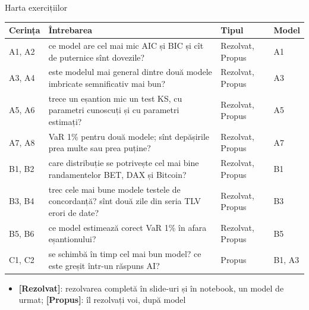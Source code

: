 \begin{frame}{Harta exercițiilor}
\itemsize{\small}
\begin{center}
\footnotesize
\begin{tabular}{>{\raggedright\arraybackslash}p{1.1cm}>{\raggedright\arraybackslash}p{7.5cm}>{\raggedright\arraybackslash}p{1.9cm}>{\raggedright\arraybackslash}p{1.4cm}}
\toprule
\textbf{Cerința} & \textbf{Întrebarea} & \textbf{Tipul} & \textbf{Model} \\
\midrule
A1, A2 & ce model are cel mai mic AIC și BIC și cît de puternice sînt dovezile? & Rezolvat, Propus & A1 \\
A3, A4 & este modelul mai general dintre două modele imbricate semnificativ mai bun? & Rezolvat, Propus & A3 \\
A5, A6 & trece un eșantion mic un test KS, cu parametri cunoscuți și cu parametri estimați? & Rezolvat, Propus & A5 \\
A7, A8 & VaR 1\% pentru două modele; sînt depășirile prea multe sau prea puține? & Rezolvat, Propus & A7 \\
B1, B2 & care distribuție se potrivește cel mai bine randamentelor BET, DAX și Bitcoin? & Rezolvat, Propus & B1 \\
B3, B4 & trec cele mai bune modele testele de concordanță? sînt două zile din seria TLV erori de date? & Rezolvat, Propus & B3 \\
B5, B6 & ce model estimează corect VaR 1\% în afara eșantionului? & Rezolvat, Propus & B5 \\
C1, C2 & se schimbă în timp cel mai bun model? ce este greșit într-un răspuns AI? & Propus & B1, A3 \\
\bottomrule
\end{tabular}
\end{center}
\begin{itemize}
    \item \textbf{[Rezolvat]}: rezolvarea completă în slide-uri și în notebook, un model de urmat; \textbf{[Propus]}: îl rezolvați voi, după model
\end{itemize}
\end{frame}

